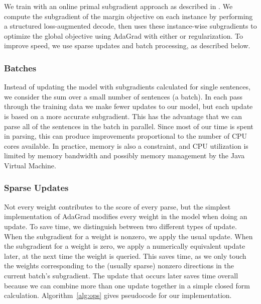 We train with an online primal subgradient approach \parencite{Ratliff:2007} as described in \textcite{Kummerfeld-etal:2015:EMNLP}.
We compute the subgradient of the margin objective on each instance by performing a structured loss-augmented decode, then uses these instance-wise subgradients to optimize the global objective using AdaGrad \parencite{Duchi:2011} with either \Lone or \Ltwo regularization.
To improve speed, we use sparse updates and batch processing, as described below.

\subsubsection{Batches}

Instead of updating the model with subgradients calculated for single sentences, we consider the sum over a small number of sentences (a batch).
In each pass through the training data we make fewer updates to our model, but each update is based on a more accurate subgradient.
This has the advantage that we can parse all of the sentences in the batch in parallel.
Since most of our time is spent in parsing, this can produce improvements proportional to the number of CPU cores available.
In practice, memory is also a constraint, and CPU utilization is limited by memory bandwidth and possibly memory management by the Java Virtual Machine.

\subsubsection{Sparse Updates}

Not every weight contributes to the score of every parse, but the simplest implementation of AdaGrad modifies every weight in the model when doing an update.
To save time, we distinguish between two different types of update.
When the subgradient for a weight is nonzero, we apply the usual update.
When the subgradient for a weight is zero, we apply a numerically equivalent update later, at the next time the weight is queried.
This saves time, as we only touch the weights corresponding to the (usually sparse) nonzero directions in the current batch's subgradient.
The update that occurs later saves time overall because we can combine more than one update together in a simple closed form calculation.
Algorithm~\ref{alg:ops} gives pseudocode for our implementation.

